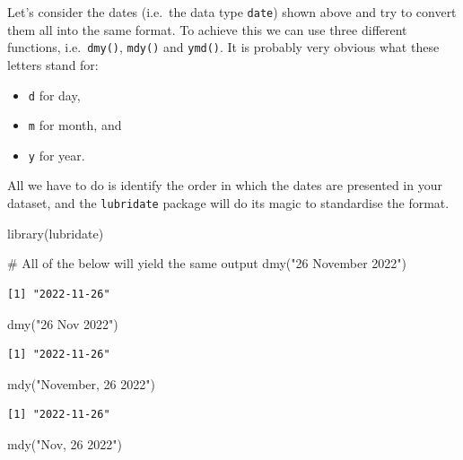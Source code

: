 \documentclass[
  letterpaper,
  DIV=11,
  numbers=noendperiod]{scrreprt}
\newenvironment{Shaded}{\begin{snugshade}}{\end{snugshade}}
\newcommand{\CommentTok}[1]{\textcolor[rgb]{0.37,0.37,0.37}{#1}}
\newcommand{\FunctionTok}[1]{\textcolor[rgb]{0.28,0.35,0.67}{#1}}
\newcommand{\NormalTok}[1]{\textcolor[rgb]{0.00,0.23,0.31}{#1}}
\newcommand{\StringTok}[1]{\textcolor[rgb]{0.13,0.47,0.30}{#1}}
\begin{document}
Let's consider the dates (i.e.~the data type \texttt{date}) shown above
and try to convert them all into the same format. To achieve this we can
use three different functions, i.e.~\texttt{dmy()}, \texttt{mdy()} and
\texttt{ymd()}. It is probably very obvious what these letters stand
for:

\begin{itemize}
\item
  \texttt{d} for day,
\item
  \texttt{m} for month, and
\item
  \texttt{y} for year.
\end{itemize}

All we have to do is identify the order in which the dates are presented
in your dataset, and the \texttt{lubridate} package will do its magic to
standardise the format.

\begin{Shaded}
\begin{Highlighting}[]
\FunctionTok{library}\NormalTok{(lubridate)}

\CommentTok{\# All of the below will yield the same output}
\FunctionTok{dmy}\NormalTok{(}\StringTok{"26 November 2022"}\NormalTok{)}
\end{Highlighting}
\end{Shaded}

\begin{verbatim}
[1] "2022-11-26"
\end{verbatim}

\begin{Shaded}
\begin{Highlighting}[]
\FunctionTok{dmy}\NormalTok{(}\StringTok{"26 Nov 2022"}\NormalTok{)}
\end{Highlighting}
\end{Shaded}

\begin{verbatim}
[1] "2022-11-26"
\end{verbatim}

\begin{Shaded}
\begin{Highlighting}[]
\FunctionTok{mdy}\NormalTok{(}\StringTok{"November, 26 2022"}\NormalTok{)}
\end{Highlighting}
\end{Shaded}

\begin{verbatim}
[1] "2022-11-26"
\end{verbatim}

\begin{Shaded}
\begin{Highlighting}[]
\FunctionTok{mdy}\NormalTok{(}\StringTok{"Nov, 26 2022"}\NormalTok{)}
\end{Highlighting}
\end{Shaded}
\end{document}
